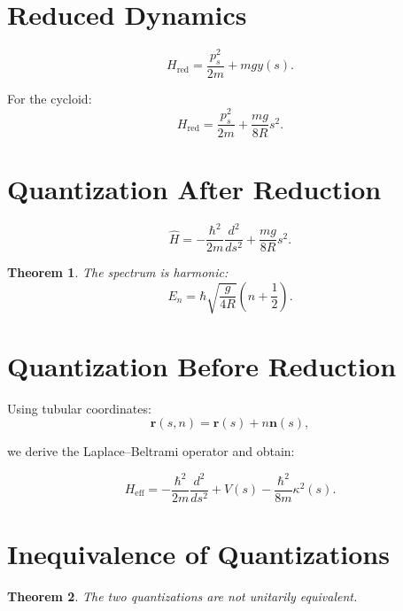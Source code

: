 \documentclass[11pt]{article}
\newtheorem{theorem}{Theorem}
\begin{document}
\section{Reduced Dynamics}

\begin{equation}
H_{\mathrm{red}} =
\frac{p_s^2}{2m} + mgy(s).
\end{equation}

For the cycloid:
\begin{equation}
H_{\mathrm{red}} =
\frac{p_s^2}{2m} + \frac{mg}{8R}s^2.
\end{equation}

\section{Quantization After Reduction}

\begin{equation}
\hat{H} =
-\frac{\hbar^2}{2m}\frac{d^2}{ds^2}
+ \frac{mg}{8R}s^2.
\end{equation}

\begin{theorem}
The spectrum is harmonic:
\begin{equation}
E_n = \hbar \sqrt{\frac{g}{4R}}\left(n+\frac{1}{2}\right).
\end{equation}
\end{theorem}

\section{Quantization Before Reduction}

Using tubular coordinates:
\[
\mathbf{r}(s,n)=\mathbf{r}(s)+n\mathbf{n}(s),
\]

we derive the Laplace–Beltrami operator and obtain:

\begin{equation}
H_{\mathrm{eff}} =
-\frac{\hbar^2}{2m}\frac{d^2}{ds^2}
+ V(s)
-\frac{\hbar^2}{8m}\kappa^2(s).
\end{equation}

\section{Inequivalence of Quantizations}

\begin{theorem}
The two quantizations are not unitarily equivalent.
\end{theorem}
\end{document}
